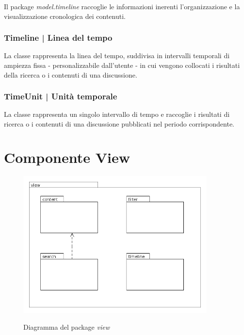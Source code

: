 \documentclass[10pt,a4paper,headinclude,footinclude,hidelinks]{scrreprt} %
\begin{document}
	Il package \textit{model.timeline} raccoglie le informazioni inerenti l'organizzazione e la visualizzazione cronologica dei contenuti.

	\subsection[Timeline]{Timeline | Linea del tempo}
	\label{sec:stage:design:model.timeline:timeline}
	La classe \textit{} rappresenta la linea del tempo, suddivisa in intervalli temporali \textit{} di ampiezza fissa - personalizzabile dall'utente - in cui vengono collocati i risultati della ricerca o i contenuti di una discussione.

	\subsection[TimeUnit]{TimeUnit | Unità temporale}
	\label{sec:stage:design:model.timeline:time-unit}
	La classe \textit{} rappresenta un singolo intervallo di tempo e raccoglie i risultati di ricerca o i contenuti di una discussione pubblicati nel periodo corrispondente.

	\chapter{Componente View}
	\label{ch:stage:design:view}

	\begin{figure}[ht]
		\begin{center}
	    	\includegraphics[width=10cm]{package/view.png}
			\label{gfx:package:view}
			\caption{Diagramma del package \textit{view}}
		\end{center}
	\end{figure}
\end{document}
